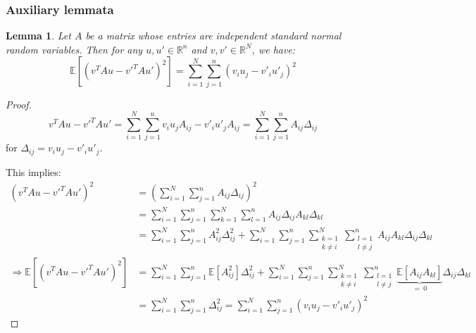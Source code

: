 \documentclass{article}
\newtheorem{lemma}{Lemma}[subsection]
\theoremstyle{remark}
\newcommand{\real}{\mathbb{R}}
\newcommand{\Exp}{\mathbb{E}}
\begin{document}
\subsubsection{Auxiliary lemmata}
\begin{lemma}
\label{lem:quadratic-random-mat-iid-entry}
Let \(A\) be a matrix whose entries are independent standard normal random variables. Then for any \(u, u' \in \real^{n}\) and \(v, v' \in \real^{N}\), we have:
\begin{equation*}
\Exp\left[(v^{T}Au - v'^{T}Au')^{2}\right] = \sum_{i=1}^{N}\sum_{j=1}^{n}(v_{i}u_{j} - v'_{i}u'_{j})^{2}
\end{equation*}
\end{lemma}
\begin{proof}
\begin{equation*}
v^{T}Au - v'^{T}Au' = \sum_{i=1}^{N}\sum_{j=1}^{n} v_{i}u_{j}A_{ij} - v'_{i}u'_{j}A_{ij} = \sum_{i=1}^{N}\sum_{j=1}^{n}A_{ij}\Delta_{ij}
\end{equation*}
for \(\Delta_{ij} = v_{i}u_{j} - v'_{i}u'_{j}\).

This implies:
\begin{align*}
(v^{T}Au - v'^{T}Au')^{2} &= \left(\sum_{i=1}^{N}\sum_{j=1}^{n}A_{ij}\Delta_{ij}\right)^{2} \\
&= \sum_{i=1}^{N}\sum_{j=1}^{n}\sum_{k=1}^{N}\sum_{l=1}^{n} A_{ij}\Delta_{ij}A_{kl}\Delta_{kl} \\
&= \sum_{i=1}^{N}\sum_{j=1}^{n} A_{ij}^{2}\Delta_{ij}^{2} + \sum_{i=1}^{N}\sum_{j=1}^{n}\sum_{\substack{k=1 \\ k \neq i}}^{N} \sum_{\substack{l=1 \\ l \neq j}}^{n} A_{ij}A_{kl}\Delta_{ij}\Delta_{kl} \\
\Rightarrow \Exp\left[(v^{T}Au - v'^{T}Au')^{2}\right] &= \sum_{i=1}^{N}\sum_{j=1}^{n} \Exp\left[A_{ij}^{2}\right]\Delta_{ij}^{2} + \sum_{i=1}^{N}\sum_{j=1}^{n}\sum_{\substack{k=1 \\ k \neq i}}^{N} \sum_{\substack{l=1 \\ l \neq j}}^{n} \underbrace{\Exp\left[A_{ij}A_{kl}\right]}_{=~0}\Delta_{ij}\Delta_{kl} \\
&= \sum_{i=1}^{N}\sum_{j=1}^{n} \Delta_{ij}^{2} = \sum_{i=1}^{N}\sum_{j=1}^{n}(v_{i}u_{j} - v'_{i}u'_{j})^{2}
\end{align*}
\end{proof}
\end{document}
